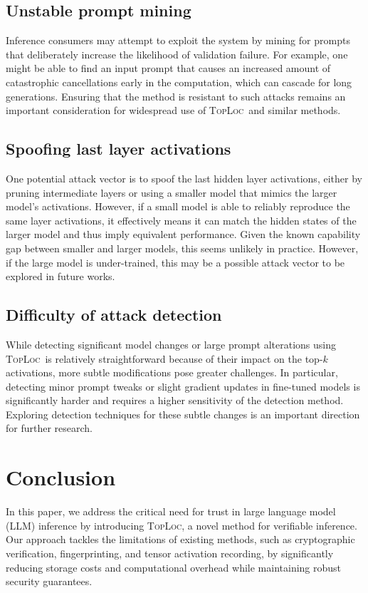 \documentclass{article}
\theoremstyle{plain}
\theoremstyle{definition}
\theoremstyle{remark}
\newcommand{\toploc}{\textsc{TopLoc}}
\begin{document}
\subsection{Unstable prompt mining}
Inference consumers may attempt to exploit the system by mining for prompts that deliberately increase the likelihood of validation failure.
For example, one might be able to find an input prompt that causes an increased amount of catastrophic cancellations early in the computation, which can cascade for long generations.
Ensuring that the method is resistant to such attacks remains an important consideration for widespread use of \toploc\ and similar methods.

\subsection{Spoofing last layer activations}
One potential attack vector is to spoof the last hidden layer activations, either by pruning intermediate layers or using a smaller model that mimics the larger model’s activations.
However, if a small model is able to reliably reproduce the same layer activations, it effectively means it can match the hidden states of the larger model and thus imply equivalent performance.
Given the known capability gap between smaller and larger models, this seems unlikely in practice.
However, if the large model is under-trained, this may be a possible attack vector to be explored in future works.

\subsection{Difficulty of attack detection}
While detecting significant model changes or large prompt alterations using \toploc \ is relatively straightforward because of their impact on the top-$k$ activations, more subtle modifications pose greater challenges.
In particular, detecting minor prompt tweaks or slight gradient updates in fine-tuned models is significantly harder and requires a higher sensitivity of the detection method.
Exploring detection techniques for these subtle changes is an important direction for further research.

\section{Conclusion}
In this paper, we address the critical need for trust in large language model (LLM) inference by introducing \toploc, a novel method for verifiable inference.
Our approach tackles the limitations of existing methods, such as cryptographic verification, fingerprinting, and tensor activation recording, by significantly reducing storage costs and computational overhead while maintaining robust security guarantees.
\end{document}
